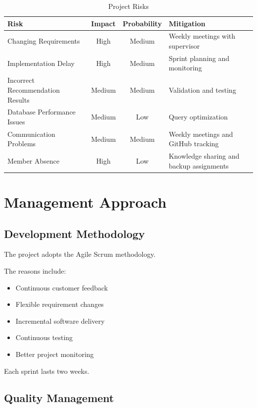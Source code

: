 \begin{table}[H]
\centering
\caption{Project Risks}
\label{tab:risks}

\begin{tabular}{|p{4cm}|c|c|p{5cm}|}
\hline
\textbf{Risk} & \textbf{Impact} & \textbf{Probability} & \textbf{Mitigation}\\
\hline
Changing Requirements & High & Medium & Weekly meetings with supervisor\\
\hline
Implementation Delay & High & Medium & Sprint planning and monitoring\\
\hline
Incorrect Recommendation Results & Medium & Medium & Validation and testing\\
\hline
Database Performance Issues & Medium & Low & Query optimization\\
\hline
Communication Problems & Medium & Medium & Weekly meetings and GitHub tracking\\
\hline
Member Absence & High & Low & Knowledge sharing and backup assignments\\
\hline
\end{tabular}
\end{table}


\section{Management Approach}

\subsection{Development Methodology}

The project adopts the Agile Scrum methodology.

The reasons include:

\begin{itemize}
\item Continuous customer feedback
\item Flexible requirement changes
\item Incremental software delivery
\item Continuous testing
\item Better project monitoring
\end{itemize}

Each sprint lasts two weeks.

\subsection{Quality Management}

